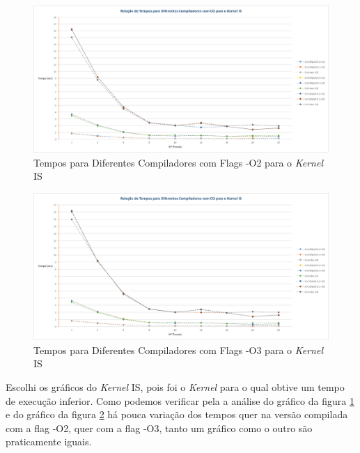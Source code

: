 \documentclass[conference,compsoc]{IEEEtran}
\begin{document}
\begin{figure}[h!]
\centering
\includegraphics[scale=0.25]{OMP/tempos_dif_comp-O2_IS_nodo-431.png}
\caption{Tempos para Diferentes Compiladores com Flags -O2 para o \textit{Kernel} IS}
\label{fig:tempos_dif_comp_omp_O2_IS_431}
\end{figure}

\begin{figure}[h!]
\centering
\includegraphics[scale=0.25]{OMP/tempos_dif_comp-O3_IS_nodo-431.png}
\caption{Tempos para Diferentes Compiladores com Flags -O3 para o \textit{Kernel} IS}
\label{fig:tempos_dif_comp_omp_O3_IS_431}
\end{figure}

Escolhi os gráficos do \textit{Kernel} IS, pois foi o \textit{Kernel} para o qual obtive um tempo de execução inferior. Como podemos verificar pela a análise do gráfico da figura \ref{fig:tempos_dif_comp_omp_O2_IS_431} e do gráfico da figura \ref{fig:tempos_dif_comp_omp_O3_IS_431} há pouca variação dos tempos quer na versão compilada com a flag -O2, quer com a flag -O3, tanto um gráfico como o outro são praticamente iguais. 
\end{document}
